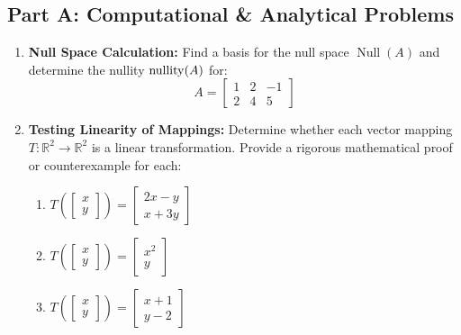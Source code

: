 \subsection*{Part A: Computational \& Analytical Problems}
\begin{enumerate}
\item \textbf{Null Space Calculation:} Find a basis for the null space $\operatorname{Null}(A)$ and determine the nullity $\operatorname{nullity}(A)$ for:
\begin{equation*}
A = \begin{bmatrix} 1 & 2 & -1 \\ 2 & 4 & 5 \end{bmatrix}
\end{equation*}

\item \textbf{Testing Linearity of Mappings:} Determine whether each vector mapping $T: \mathbb{R}^2 \to \mathbb{R}^2$ is a linear transformation. Provide a rigorous mathematical proof or counterexample for each:
\begin{enumerate}
    \item $T\left(\begin{bmatrix} x \\ y \end{bmatrix}\right) = \begin{bmatrix} 2x - y \\ x + 3y \end{bmatrix}$
    \item $T\left(\begin{bmatrix} x \\ y \end{bmatrix}\right) = \begin{bmatrix} x^2 \\ y \end{bmatrix}$
    \item $T\left(\begin{bmatrix} x \\ y \end{bmatrix}\right) = \begin{bmatrix} x + 1 \\ y - 2 \end{bmatrix}$
\end{enumerate}


\end{enumerate}
